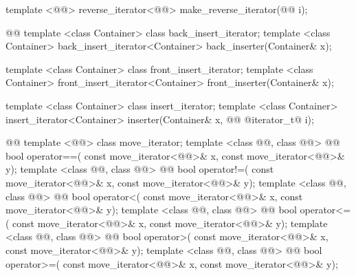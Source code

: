 \begin{codeblock}
  template <@@>
    reverse_iterator<@@> make_reverse_iterator(@@ i);

  @@
  template <class Container> class back_insert_iterator;
  template <class Container>
    back_insert_iterator<Container> back_inserter(Container& x);

  template <class Container> class front_insert_iterator;
  template <class Container>
    front_insert_iterator<Container> front_inserter(Container& x);

  template <class Container> class insert_iterator;
  template <class Container>
    insert_iterator<Container> inserter(Container& x, @@
      @iterator_t@ i);

  @@
  template <@@> class move_iterator;
  template <class @@, class @@>
      @@
    bool operator==(
      const move_iterator<@@>& x, const move_iterator<@@>& y);
  template <class @@, class @@>
      @@
    bool operator!=(
      const move_iterator<@@>& x, const move_iterator<@@>& y);
  template <class @@, class @@>
      @@
    bool operator<(
      const move_iterator<@@>& x, const move_iterator<@@>& y);
  template <class @@, class @@>
      @@
    bool operator<=(
      const move_iterator<@@>& x, const move_iterator<@@>& y);
  template <class @@, class @@>
      @@
    bool operator>(
      const move_iterator<@@>& x, const move_iterator<@@>& y);
  template <class @@, class @@>
      @@
    bool operator>=(
      const move_iterator<@@>& x, const move_iterator<@@>& y);


\end{codeblock}

